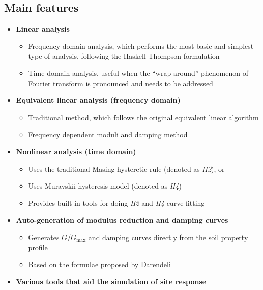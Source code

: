 \documentclass[11pt,letterpaper]{article}
\begin{document}
\subsection{Main features}
\begin{itemize}
    \item \textbf{\textsf{Linear analysis}}
        \begin{itemize}
            \item Frequency domain analysis, which performs the most basic and simplest type of analysis, following the Haskell-Thompson formulation
            \item Time domain analysis, useful when the ``wrap-around'' phenomenon of Fourier transform is pronounced and needs to be addressed
        \end{itemize}
    \item \textbf{\textsf{Equivalent linear analysis (frequency domain)}}
        \begin{itemize}
            \item Traditional method, which follows the original equivalent linear algorithm
            \item Frequency dependent moduli and damping method
        \end{itemize}
    \item \textbf{\textsf{Nonlinear analysis (time domain)}}
        \begin{itemize}
            \item Uses the traditional Masing hysteretic rule (denoted as \emph{H2}), or
            \item Uses Muravskii hysteresis model (denoted as \emph{H4})
            \item Provides built-in tools for doing \emph{H2} and \emph{H4} curve fitting
        \end{itemize}
    \item \textbf{\textsf{Auto-generation of modulus reduction and damping curves}}
        \begin{itemize}
            \item Generates $G/G_{\text{max}}$ and damping curves directly from the soil property profile
            \item Based on the formulae proposed by Darendeli
        \end{itemize}
    \item \textbf{\textsf{Various tools that aid the simulation of site response}}
        \begin{itemize}

\end{itemize}
\end{itemize}
\end{document}
